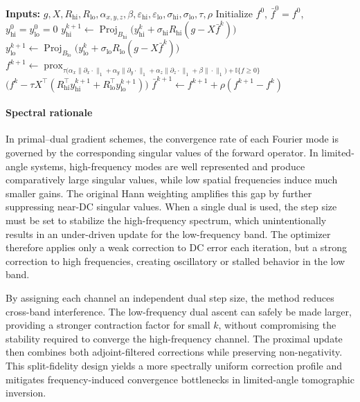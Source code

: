 \documentclass[journal, a4paper]{IEEEtran}
\begin{document}
\begin{algorithm}[t]
\caption{PDHG with split fidelity channels}
\begin{algorithmic}[1]
\State \textbf{Inputs:} $g, X, R_{\mathrm{hi}}, R_{\mathrm{lo}}, \alpha_{x,y,z}, \beta, \varepsilon_{\mathrm{hi}}, \varepsilon_{\mathrm{lo}}, \sigma_{\mathrm{hi}}, \sigma_{\mathrm{lo}}, \tau, \rho$
\State Initialize $f^0$, $\bar f^0 = f^0$, $y_{\mathrm{hi}}^0 = y_{\mathrm{lo}}^0 = 0$
    \State $y_{\mathrm{hi}}^{k+1} \gets \operatorname{Proj}_{B_{\mathrm{hi}}}\!\big(y_{\mathrm{hi}}^k + \sigma_{\mathrm{hi}} R_{\mathrm{hi}}(g - X\bar f^k)\big)$
    \State $y_{\mathrm{lo}}^{k+1} \gets \operatorname{Proj}_{B_{\mathrm{lo}}}\!\big(y_{\mathrm{lo}}^k + \sigma_{\mathrm{lo}} R_{\mathrm{lo}}(g - X\bar f^k)\big)$
    \State $f^{k+1} \gets \operatorname{prox}_{\tau\big(\alpha_x\|\partial_x \cdot\|_1 + \alpha_y\|\partial_y \cdot\|_1 + \alpha_z\|\partial_z \cdot\|_1 + \beta\|\cdot\|_1\big) + \mathbb{I}\{f \ge 0\}}$ $\Big(f^k - \tau X^\top(R_{\mathrm{hi}}^\top y_{\mathrm{hi}}^{k+1} + R_{\mathrm{lo}}^\top y_{\mathrm{lo}}^{k+1})\Big)$
    \State $\bar f^{k+1} \gets f^{k+1} + \rho(f^{k+1} - f^k)$ 
\EndFor
\end{algorithmic}
\end{algorithm}

\paragraph{Spectral rationale}
In primal–dual gradient schemes, the convergence rate of each Fourier mode is governed by the corresponding singular values of the forward operator. In limited-angle systems, high-frequency modes are well represented and produce comparatively large singular values, while low spatial frequencies induce much smaller gains. The original Hann weighting amplifies this gap by further suppressing near-DC singular values. When a single dual is used, the step size must be set to stabilize the high-frequency spectrum, which unintentionally results in an under-driven update for the low-frequency band. The optimizer therefore applies only a weak correction to DC error each iteration, but a strong correction to high frequencies, creating oscillatory or stalled behavior in the low band.

By assigning each channel an independent dual step size, the method reduces cross-band interference. The low-frequency dual ascent can safely be made larger, providing a stronger contraction factor for small $k$, without compromising the stability required to converge the high-frequency channel. The proximal update then combines both adjoint-filtered corrections while preserving non-negativity. This split-fidelity design yields a more spectrally uniform correction profile and mitigates frequency-induced convergence bottlenecks in limited-angle tomographic inversion.
\end{document}
